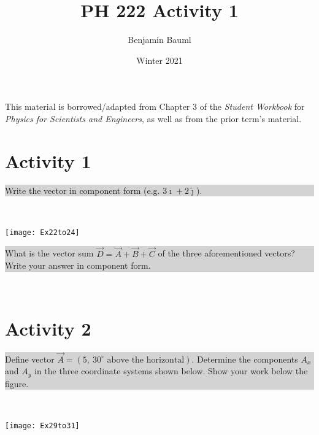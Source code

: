 \documentclass[]{article}
\title{PH 222 Activity 1}
\author{Benjamin Bauml}
\date{Winter 2021}
\newcommand{\excerpt}[1]{\colorbox{lightgray}{\parbox{14.8cm}{#1}} \\}
\begin{document}
\maketitle

\begin{center}
This material is borrowed/adapted from Chapter 3 of the \textit{Student Workbook} for \textit{Physics for Scientists and Engineers}, as well as from the prior term's material.
\end{center}
\section*{Activity 1}%
\excerpt{
Write the vector in component form (e.g. $ 3\hat{\imath}+2\hat{\jmath} $).
}
\begin{center}
	\texttt{[image: Ex22to24]}
\end{center}
\excerpt{
What is the vector sum $ \vec{D} = \vec{A} + \vec{B} + \vec{C} $ of the three aforementioned vectors? Write your answer in component form.
}
\phantom{\parbox{\textwidth}{
\[
\vec{D} = (3-1-3)\hat{\imath} + (1-2+0)\hat{\jmath} = -\hat{\imath}-\hat{\jmath}
\]
}}

\section*{Activity 2}%
\excerpt{
Define vector $ \vec{A} = (5,\ 30^{\circ}\text{ above the horizontal}) $. Determine the components $ A_{x} $ and $ A_{y} $ in the three coordinate systems shown below. Show your work below the figure.
}
\begin{center}
	\texttt{[image: Ex29to31]}
\end{center}

\pagebreak
\end{document}
